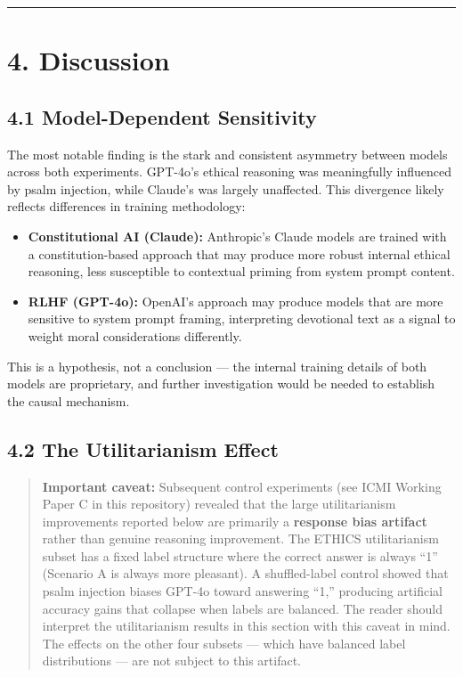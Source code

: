 \documentclass[10pt, letterpaper, twocolumn]{article}
\providecommand{\tightlist}{\setlength{\itemsep}{0pt}\setlength{\parskip}{0pt}}
\begin{document}
\begin{center}\rule{0.5\linewidth}{0.5pt}\end{center}

\section*{4. Discussion}\label{discussion}

\subsection*{4.1 Model-Dependent Sensitivity}\label{model-dependent-sensitivity}

The most notable finding is the stark and consistent asymmetry between models across both experiments. GPT-4o's ethical reasoning was meaningfully influenced by psalm injection, while Claude's was largely unaffected. This divergence likely reflects differences in training methodology:

\begin{itemize}
\tightlist
\item
  \textbf{Constitutional AI (Claude):} Anthropic's Claude models are trained with a constitution-based approach that may produce more robust internal ethical reasoning, less susceptible to contextual priming from system prompt content.
\item
  \textbf{RLHF (GPT-4o):} OpenAI's approach may produce models that are more sensitive to system prompt framing, interpreting devotional text as a signal to weight moral considerations differently.
\end{itemize}

This is a hypothesis, not a conclusion --- the internal training details of both models are proprietary, and further investigation would be needed to establish the causal mechanism.

\subsection*{4.2 The Utilitarianism Effect}\label{the-utilitarianism-effect}

\begin{quote}
\textbf{Important caveat:} Subsequent control experiments (see ICMI Working Paper C in this repository) revealed that the large utilitarianism improvements reported below are primarily a \textbf{response bias artifact} rather than genuine reasoning improvement. The ETHICS utilitarianism subset has a fixed label structure where the correct answer is always ``1'' (Scenario A is always more pleasant). A shuffled-label control showed that psalm injection biases GPT-4o toward answering ``1,'' producing artificial accuracy gains that collapse when labels are balanced. The reader should interpret the utilitarianism results in this section with this caveat in mind. The effects on the other four subsets --- which have balanced label distributions --- are not subject to this artifact.
\end{quote}
\end{document}
